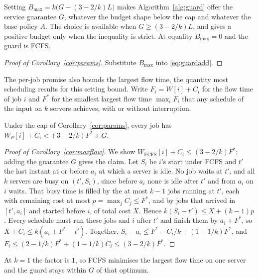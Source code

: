 \begin{corollary}
\label{cor:params}
Setting $B_{\max} = k\bigl(G - (3 - 2/k)L\bigr)$ makes Algorithm~\ref{alg:guard} offer the
service guarantee $G$, whatever the budget shape below the cap and whatever the base policy
$A$. The choice is available when $G \ge (3 - 2/k)L$, and gives a positive budget only when
the inequality is strict. At equality $B_{\max} = 0$ and the guard is FCFS.
\end{corollary}

\begin{proof}[Proof of Corollary~\ref{cor:params}]
Substitute $B_{\max}$ into \eqref{eq:guardadd}.
\end{proof}

The per-job promise also bounds the largest flow time, the quantity most scheduling
results for this setting bound. Write $F_i = W[i] + C_i$ for the flow time of job $i$ and
$F^*$ for the smallest largest flow time $\max_i F_i$ that any schedule of the input on $k$
servers achieves, with or without interruption.

\begin{corollary}
\label{cor:maxflow}
Under the cap of Corollary~\ref{cor:params}, every job has
$W_P[i] + C_i < (3 - 2/k)F^* + G$.
\end{corollary}

\begin{proof}[Proof of Corollary~\ref{cor:maxflow}]
We show $W_{\mathrm{FCFS}}[i] + C_i \le (3 - 2/k)F^*$; adding the guarantee $G$ gives the
claim. Let $S_i$ be $i$'s start under FCFS and $t'$ the last instant at or before $a_i$ at
which a server is idle. No job waits at $t'$, and all $k$ servers are busy on
$(t', S_i)$, since before $a_i$ none is idle after $t'$ and from $a_i$ on $i$ waits. That busy time is filled by the at most $k - 1$ jobs running at $t'$,
each with remaining cost at most $p = \max_j C_j \le F^*$, and by jobs that arrived in
$[t', a_i]$ and started before $i$, of total cost $X$. Hence $k(S_i - t') \le X +
(k-1)p$. Every schedule must run these jobs and $i$ after $t'$ and finish them by $a_i +
F^*$, so $X + C_i \le k(a_i + F^* - t')$. Together, $S_i - a_i \le F^* - C_i/k +
(1 - 1/k)F^*$, and $F_i \le (2 - 1/k)F^* + (1 - 1/k)C_i \le (3 - 2/k)F^*$.
\end{proof}

At $k = 1$ the factor is $1$, so FCFS minimises the largest flow time on one server and the
guard stays within $G$ of that optimum.

